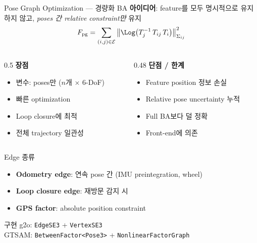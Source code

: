 \begin{frame}[shrink=10]{Pose Graph Optimization — 경량화 BA}
  \textbf{아이디어}: feature를 모두 명시적으로 유지하지 않고, \emph{poses 간 relative constraint만} 유지
  \[
    F_{\mathrm{pg}} = \sum_{(i,j)\in\mathcal{E}}
      \left\|\Log\!\left(T_j^{-1}\,T_{ij}\,T_i\right)\right\|_{\Sigma_{ij}}^2
  \]
  \pause
  \begin{columns}[T]
    \begin{column}{0.5\textwidth}
      \textbf{장점}
      \begin{itemize}
        \item 변수: poses만 ($n$개 $\times$ 6-DoF)
        \item 빠른 optimization
        \item Loop closure에 최적
        \item 전체 trajectory 일관성
      \end{itemize}
    \end{column}
    \begin{column}{0.48\textwidth}
      \textbf{단점 / 한계}
      \begin{itemize}
        \item Feature position 정보 손실
        \item Relative pose uncertainty 누적
        \item Full BA보다 덜 정확
        \item Front-end에 의존
      \end{itemize}
    \end{column}
  \end{columns}
  \pause
  \vspace{0.3em}
  \begin{block}{Edge 종류}
    \begin{itemize}
      \item \textbf{Odometry edge}: 연속 pose 간 (IMU preintegration, wheel)
      \item \textbf{Loop closure edge}: 재방문 감지 시
      \item \textbf{GPS factor}: absolute position constraint
    \end{itemize}
  \end{block}
  \pause
  \begin{exampleblock}{구현}
    g2o: \texttt{EdgeSE3} + \texttt{VertexSE3}\\
    GTSAM: \texttt{BetweenFactor<Pose3>} + \texttt{NonlinearFactorGraph}
  \end{exampleblock}
\end{frame}

